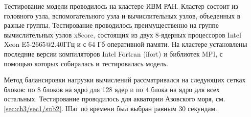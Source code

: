 Тестирование модели проводилось на кластере ИВМ РАН. Кластер состоит из головного узла, вспомогательного узла и вычислительных узлов,
объеденных в разные группы. Тестирование проводилось преимущественно на группе вычислительных узлов x8core, состоящих из двух 8-ядерных процессоров Intel Xeon E5-2665@2.40ГГц и с 64 Гб оперативной памяти.
	На кластере установлены последние версии компиляторов Intel Fortran (ifort) и библиотек MPI, с помощью которых собиралась и тестировалась модель.
	
Метод балансировки нагрузки вычислений рассматривался на следующих сетках блоков:
	по 8 блоков на ядро для 128 ядер и по 4 блока на ядро для всех остальных. 
	Тестирование проводилось для акватории Азовского моря, см. \ref{sec:ch3/sec1/sub2}. Шаг по времени был выбран равным 30 секундам.
	
	
